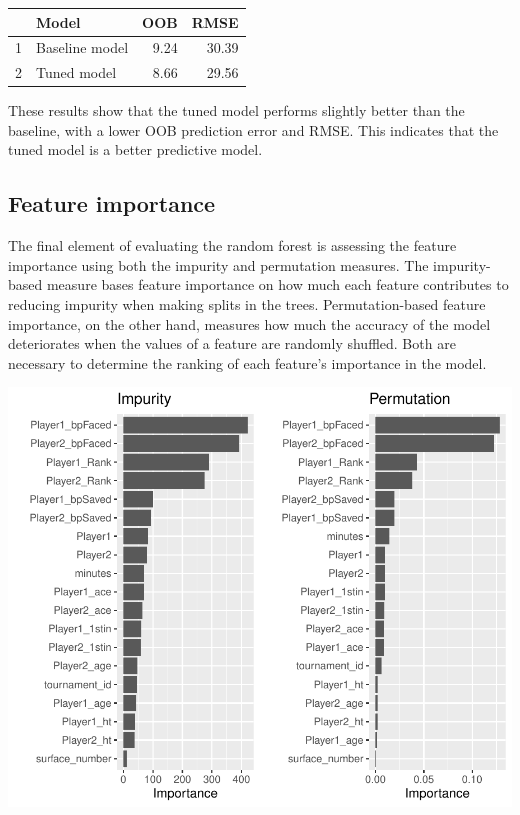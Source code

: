 \documentclass[11pt,preprint, authoryear]{elsarticle}
\let\origtable\table
\let\endorigtable\endtable
\renewenvironment{table}[1][2] {
    \expandafter\origtable\expandafter[H]
} {
    \endorigtable
}
\numberwithin{equation}{section}
\numberwithin{figure}{section}
\numberwithin{table}{section}
\begin{document}
\begin{table}[ht]
\centering
\begin{tabular}{rlrr}
  \hline
 & Model & OOB & RMSE \\ 
  \hline
1 & Baseline model & 9.24 & 30.39 \\ 
  2 & Tuned model & 8.66 & 29.56 \\ 
   \hline
\end{tabular}
\caption{Errors Across the Baseline and Tuned Models in Percent} 
\end{table}

These results show that the tuned model performs slightly better than
the baseline, with a lower OOB prediction error and RMSE. This indicates
that the tuned model is a better predictive model.

\hypertarget{feature-importance}{%
\subsection{Feature importance}\label{feature-importance}}

The final element of evaluating the random forest is assessing the
feature importance using both the impurity and permutation measures. The
impurity-based measure bases feature importance on how much each feature
contributes to reducing impurity when making splits in the trees.
Permutation-based feature importance, on the other hand, measures how
much the accuracy of the model deteriorates when the values of a feature
are randomly shuffled. Both are necessary to determine the ranking of
each feature's importance in the model.

\includegraphics{Write-up_files/figure-latex/feature importance-1.pdf}
\end{document}

